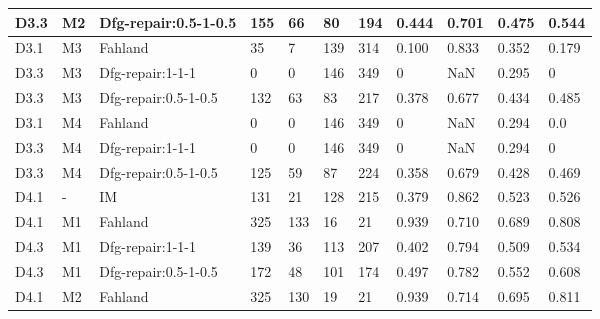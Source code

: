 \begin{table}[ht]
{\begin{tabular}{lll|llllllll|}
			D3.3      & M2              & Dfg-repair:0.5-1-0.5       & 155    &   66 &   80  & 194    &  0.444      &   0.701        &  0.475         &  0.544      \\
			\hline
			D3.1      & M3              & Fahland   & 35    & 7   &  139   &  314   &  0.100      &   0.833        &   0.352       &  0.179    \\
			
			D3.3      & M3              & Dfg-repair:1-1-1       &  0   &   0 &  146   &  349   &  0      &   NaN        &  0.295       &   0      \\
			D3.3      & M3              & Dfg-repair:0.5-1-0.5       &  132   &   63 &  83   &  217   &  0.378      &   0.677        &  0.434        &   0.485      \\
			\hline
			
			D3.1      & M4              & Fahland   &  0   & 0  &  146   &  349   & 0       &   NaN        &   0.294      &  0.0         \\
			
			D3.3      & M4              & Dfg-repair:1-1-1       &  0   &  0  &   146  &  349   &  0     &      NaN     & 0.294        & 0   \\
			D3.3      & M4              & Dfg-repair:0.5-1-0.5       &  125   &  59  &   87  &  224   &  0.358     &      0.679     & 0.428        & 0.469   \\
			\hline
			D4.1      & -              & IM &  131   &  21  & 128    &  215   &    0.379    & 0.862           &   0.523       &    0.526     \\
			D4.1      & M1              & Fahland   &  325   &  133  &  16   & 21    &   0.939     &  0.710         &  0.689       & 0.808                \\
			
			D4.3      & M1              & Dfg-repair:1-1-1       &  139   & 36   & 113    &   207  &   0.402     &   0.794        &   0.509       &   0.534                   \\
			D4.3      & M1              & Dfg-repair:0.5-1-0.5       &  172   & 48   & 101    &   174  &   0.497     &   0.782       &   0.552       &   0.608                   \\
			\hline
			D4.1      & M2              & Fahland   & 325    &  130  & 19    &  21   & 0.939       &    0.714       &  0.695        &  0.811                \\
			

\end{tabular}}
\end{table}
